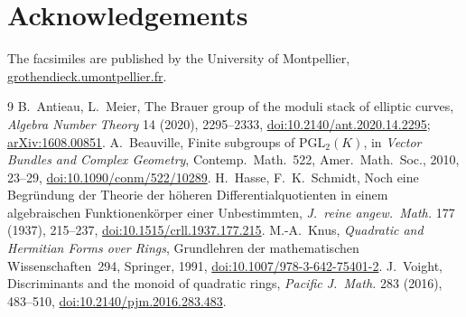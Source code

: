 \documentclass[11pt,a4paper]{amsart}
\theoremstyle{definition}
\theoremstyle{remark}
\begin{document}
\section*{Acknowledgements}
The facsimiles are published by the University of Montpellier, \href{https://grothendieck.umontpellier.fr/}{grothendieck.umontpellier.fr}.

\begin{thebibliography}{9}
 B.~Antieau, L.~Meier, The Brauer group of the moduli stack of elliptic curves, \emph{Algebra Number Theory} 14 (2020), 2295--2333, \href{https://doi.org/10.2140/ant.2020.14.2295}{doi:10.2140/ant.2020.14.2295}; \href{https://arxiv.org/abs/1608.00851}{arXiv:1608.00851}.
 A.~Beauville, Finite subgroups of $\mathrm{PGL}_2(K)$, in \emph{Vector Bundles and Complex Geometry}, Contemp.\ Math.~522, Amer.\ Math.\ Soc., 2010, 23--29, \href{https://doi.org/10.1090/conm/522/10289}{doi:10.1090/conm/522/10289}.
 H.~Hasse, F.~K.~Schmidt, Noch eine Begründung der Theorie der höheren Differentialquotienten in einem algebraischen Funktionenkörper einer Unbestimmten, \emph{J.\ reine angew.\ Math.} 177 (1937), 215--237, \href{https://doi.org/10.1515/crll.1937.177.215}{doi:10.1515/crll.1937.177.215}.
 M.-A.~Knus, \emph{Quadratic and Hermitian Forms over Rings}, Grundlehren der mathematischen Wissenschaften~294, Springer, 1991, \href{https://doi.org/10.1007/978-3-642-75401-2}{doi:10.1007/978-3-642-75401-2}.
 J.~Voight, Discriminants and the monoid of quadratic rings, \emph{Pacific J.\ Math.} 283 (2016), 483--510, \href{https://doi.org/10.2140/pjm.2016.283.483}{doi:10.2140/pjm.2016.283.483}.
\end{thebibliography}
\end{document}
